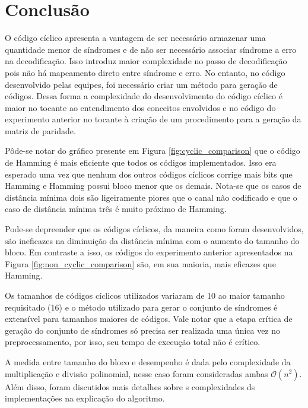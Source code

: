 \section{Conclusão}
 O código cíclico apresenta a vantagem de ser necessário armazenar uma quantidade menor de síndromes e de não ser necessário associar síndrome a erro na decodificação. Isso introduz maior complexidade no passo de decodificação pois não há mapeamento direto entre síndrome e erro. No entanto, no código desenvolvido pelas equipes, foi necessário criar um método para geração de códigos. Dessa forma a complexidade do desenvolvimento do código cíclico é maior no tocante ao entendimento dos conceitos envolvidos e no código do experimento anterior no tocante à criação de um procedimento para a geração da matriz de paridade.
 
 Pôde-se notar do gráfico presente em Figura \ref{fig:cyclic_comparison} que o código de Hamming é mais eficiente que todos os códigos implementados. Isso era esperado uma vez que nenhum dos outros códigos cíclicos corrige mais bits que Hamming e Hamming possui bloco menor que os demais. Nota-se que os casos de distância mínima dois são ligeiramente piores que o canal não codificado e que o caso de distância mínima três é muito próximo de Hamming.
 
 Pode-se depreender que os códigos cíclicos, da maneira como foram desenvolvidos, são ineficazes na diminuição da distância mínima com o aumento do tamanho do bloco. Em contraste a isso, os códigos do experimento anterior apresentados na Figura \ref{fig:non_cyclic_comparison} são, em sua maioria, mais eficazes que Hamming.
 
 Os tamanhos de códigos cíclicos utilizados variaram de 10 ao maior tamanho requisitado (16) e o método utilizado para gerar o conjunto de síndromes é extensível para tamanhos maiores de códigos. Vale notar que a etapa crítica de geração do conjunto de síndromes só precisa ser realizada uma única vez no preprocessamento, por isso, seu tempo de execução total não é crítico.
 
 A medida entre tamanho do bloco e desempenho é dada pelo complexidade da multiplicação e divisão polinomial, nesse caso foram consideradas ambas $\mathcal{O}(n^2)$. Além disso, foram discutidos mais detalhes sobre s complexidades ds implementações na explicação do algoritmo.